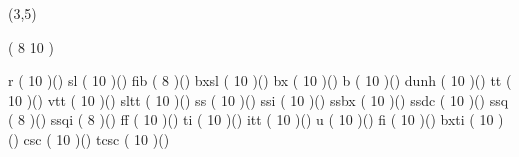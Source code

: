 %
%
%
%
%
%
%

\lhvercheck(3,5)

%
     \tablevalues                         ( 8 10 )

     \makefont \fonttwoletters r          (   10 )()
     \makefont \fonttwoletters sl         (   10 )()
     \makefont \fonttwoletters fib        ( 8    )()
     \makefont \fonttwoletters bxsl       (   10 )()
     \makefont \fonttwoletters bx         (   10 )()
     \makefont \fonttwoletters b          (   10 )()
     \makefont \fonttwoletters dunh       (   10 )()
     \makefont \fonttwoletters tt         (   10 )()
     \makefont \fonttwoletters vtt        (   10 )()
     \makefont \fonttwoletters sltt       (   10 )()
     \makefont \fonttwoletters ss         (   10 )()
     \makefont \fonttwoletters ssi        (   10 )()
     \makefont \fonttwoletters ssbx       (   10 )()
     \makefont \fonttwoletters ssdc       (   10 )()
     \makefont \fonttwoletters ssq        ( 8    )()
     \makefont \fonttwoletters ssqi       ( 8    )()
     \makefont \fonttwoletters ff         (   10 )()
     \makefont \fonttwoletters ti         (   10 )()
     \makefont \fonttwoletters itt        (   10 )()
     \makefont \fonttwoletters u          (   10 )()
     \makefont \fonttwoletters fi         (   10 )()
     \makefont \fonttwoletters bxti       (   10 )()
     \makefont \fonttwoletters csc        (   10 )()
     \makefont \fonttwoletters tcsc       (   10 )()
